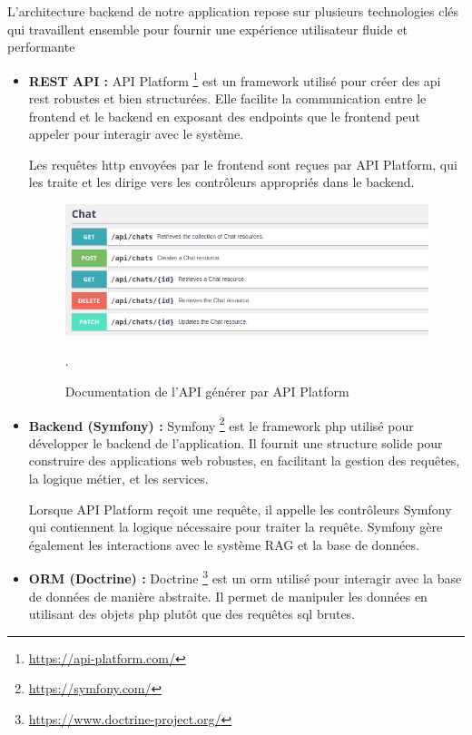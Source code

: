L'architecture backend de notre application repose sur plusieurs technologies clés qui travaillent ensemble pour fournir une expérience utilisateur fluide et performante

\begin{itemize}
    \item \textbf{REST API :}
    API Platform \footnote{\href{https://api-platform.com/}{https://api-platform.com/}} est un framework utilisé pour créer des \ac{api} \ac{rest} robustes et bien structurées. Elle facilite la communication entre le frontend et le backend en exposant des endpoints que le frontend peut appeler pour interagir avec le système.
    
    Les requêtes \ac{http} envoyées par le frontend sont reçues par API Platform, qui les traite et les dirige vers les contrôleurs appropriés dans le backend.

    \begin{figure}[H]
        \centering
        \includegraphics[width=15cm]{gfx/fig-api-doc.png}
        \caption{Documentation de l'API générer par API Platform}.
        \label{fig:api-doc}
    \end{figure}

    \item \textbf{Backend (Symfony) :}
    Symfony \footnote{\href{https://symfony.com/}{https://symfony.com/}} est le framework \acs{php} utilisé pour développer le backend de l'application. Il fournit une structure solide pour construire des applications web robustes, en facilitant la gestion des requêtes, la logique métier, et les services.
    
    Lorsque API Platform reçoit une requête, il appelle les contrôleurs Symfony qui contiennent la logique nécessaire pour traiter la requête. Symfony gère également les interactions avec le système RAG et la base de données.

    \item \textbf{ORM (Doctrine) :}
    Doctrine \footnote{\href{https://www.doctrine-project.org/}{https://www.doctrine-project.org/}} est un \ac{orm} utilisé pour interagir avec la base de données de manière abstraite. Il permet de manipuler les données en utilisant des objets \acs{php} plutôt que des requêtes \acs{sql} brutes.
    

\end{itemize}
